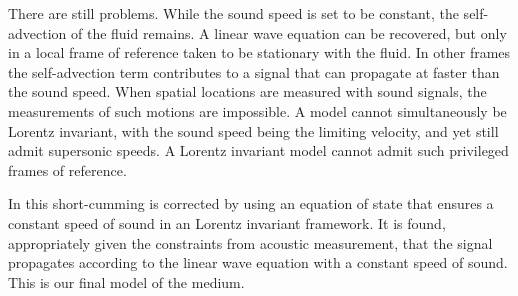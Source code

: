 There are still problems.
While the sound speed is set to be constant,
the self-advection of the fluid remains.
A linear wave equation can be recovered, but only in a local frame of reference taken to be stationary with the fluid.
In other frames the self-advection term contributes to a signal that can propagate at faster than the sound speed.
%
%
When spatial locations are measured with sound signals,
the measurements of such motions are impossible.
A model cannot simultaneously be Lorentz invariant, with the sound speed being the limiting velocity,
and yet still admit supersonic speeds.
A Lorentz invariant model cannot admit such privileged frames of reference.
%
%

In  this short-cumming is corrected by using an equation of state that ensures a constant speed of sound in an Lorentz invariant framework.
It is found, appropriately given the constraints from acoustic measurement,
that the signal propagates according to the linear wave equation with a constant speed of sound.
This is our final model of the medium.














